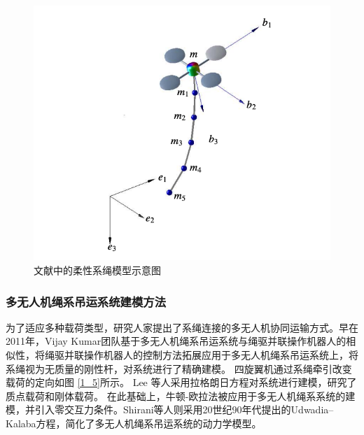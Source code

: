 \documentclass[lang=chs, degree=master, blindreview=true, winfonts=true]{yanputhesis}
\begin{document}
\begin{figure}[hbt!]
	\centering
	\includegraphics[width=28pc]{picture/1_4.png} 
	\caption{文献中的柔性系绳模型示意图} \label{1_4}
\end{figure}


\subsubsection{多无人机绳系吊运系统建模方法}
为了适应多种载荷类型，研究人家提出了系绳连接的多无人机协同运输方式。早在2011年，Vijay Kumar团队\cite{Gouttefarde2006,Gouttefarde2011}基于多无人机绳系吊运系统与绳驱并联操作机器人\cite{Gouttefarde2006,Gouttefarde2011}的相似性，将绳驱并联操作机器人的控制方法拓展应用于多无人机绳系吊运系统上，将系绳视为无质量的刚性杆，对系统进行了精确建模\cite{Fink2011,michael2011cooperative,Jiang2013}。
四旋翼机通过系绳牵引改变载荷的定向如图 \ref{1_5}所示。
Lee 等人采用拉格朗日方程对系统进行建模，研究了质点载荷\cite{lee2013geometric}和刚体载荷\cite{lee2017geometric}。
在此基础上，牛顿-欧拉法被应用于多无人机绳系系统的建模，并引入零交互力条件\cite{cardona2019cooperative}。Shirani等人\cite{shirani2019cooperative}则采用20世纪90年代提出的Udwadia–Kalaba方程\cite{udwadia1992new,udwadia1996equations}，简化了多无人机绳系吊运系统的动力学模型。
\end{document}
